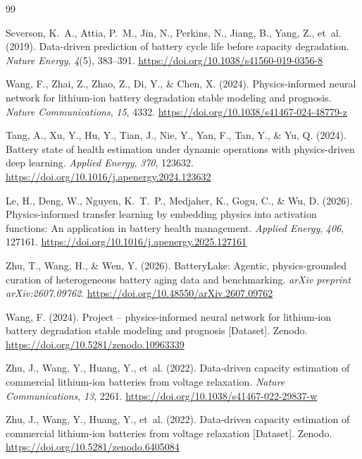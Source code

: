 \documentclass[preprint,12pt]{elsarticle}
\begin{document}
\begin{thebibliography}{99}

Severson, K.~A., Attia, P.~M., Jin, N., Perkins, N., Jiang, B., Yang, Z., et~al. (2019). Data-driven prediction of battery cycle life before capacity degradation. \textit{Nature Energy}, \textit{4}(5), 383--391. \url{https://doi.org/10.1038/s41560-019-0356-8}

Wang, F., Zhai, Z., Zhao, Z., Di, Y., \& Chen, X. (2024). Physics-informed neural network for lithium-ion battery degradation stable modeling and prognosis. \textit{Nature Communications}, \textit{15}, 4332. \url{https://doi.org/10.1038/s41467-024-48779-z}

Tang, A., Xu, Y., Hu, Y., Tian, J., Nie, Y., Yan, F., Tan, Y., \& Yu, Q. (2024). Battery state of health estimation under dynamic operations with physics-driven deep learning. \textit{Applied Energy}, \textit{370}, 123632. \url{https://doi.org/10.1016/j.apenergy.2024.123632}

Le, H., Deng, W., Nguyen, K.~T.~P., Medjaher, K., Gogu, C., \& Wu, D. (2026). Physics-informed transfer learning by embedding physics into activation functions: An application in battery health management. \textit{Applied Energy}, \textit{406}, 127161. \url{https://doi.org/10.1016/j.apenergy.2025.127161}

Zhu, T., Wang, H., \& Wen, Y. (2026). BatteryLake: Agentic, physics-grounded curation of heterogeneous battery aging data and benchmarking. \textit{arXiv preprint arXiv:2607.09762}. \url{https://doi.org/10.48550/arXiv.2607.09762}

Wang, F. (2024). Project -- physics-informed neural network for lithium-ion battery degradation stable modeling and prognosis [Dataset]. Zenodo. \url{https://doi.org/10.5281/zenodo.10963339}

Zhu, J., Wang, Y., Huang, Y., et~al. (2022). Data-driven capacity estimation of commercial lithium-ion batteries from voltage relaxation. \textit{Nature Communications}, \textit{13}, 2261. \url{https://doi.org/10.1038/s41467-022-29837-w}

Zhu, J., Wang, Y., Huang, Y., et~al. (2022). Data-driven capacity estimation of commercial lithium-ion batteries from voltage relaxation [Dataset]. Zenodo. \url{https://doi.org/10.5281/zenodo.6405084}


\end{thebibliography}
\end{document}
